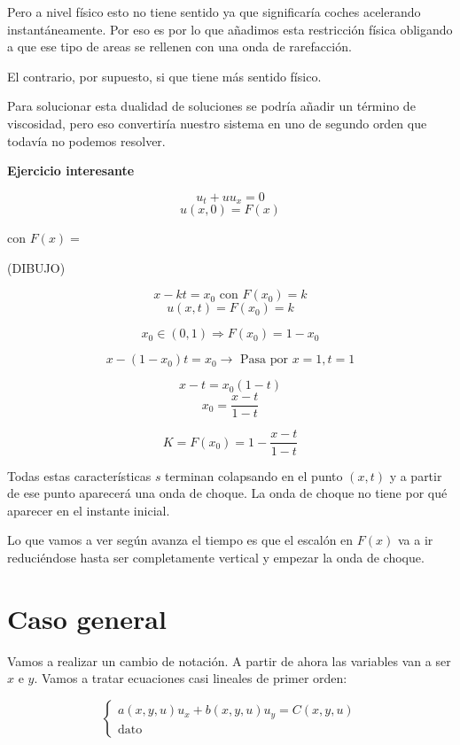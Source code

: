 		Pero a nivel físico esto no tiene sentido ya que significaría coches acelerando instantáneamente. Por eso es por lo que añadimos esta restricción física obligando a que ese tipo de areas se rellenen con una onda de rarefacción.

		El contrario, por supuesto, si que tiene más sentido físico.

		Para solucionar esta dualidad de soluciones se podría añadir un término de viscosidad, pero eso convertiría nuestro sistema en uno de segundo orden que todavía no podemos resolver.

		\textbf{Ejercicio interesante}

			$$u_t + uu_x = 0$$
			$$u(x,0) = F(x) $$

			con $F(x) = $

			(DIBUJO)

			$$x - kt = x_0 \text{ con } F(x_0) = k $$
			$$u(x,t) = F(x_0) = k$$

			$$x_0 \in (0,1) \Rightarrow F(x_0) = 1 - x_0 $$

			$$x - (1-x_0) t = x_0 \rightarrow \text{ Pasa por } x = 1, t = 1$$

			$$x-t = x_0 (1-t)$$
			$$x_0 = \frac{x-t}{1-t}$$

			$$K = F(x_0) = 1 - \frac{x-t}{1-t}$$

			Todas estas características $s$ terminan colapsando en el punto $(x,t)$ y a partir de ese punto aparecerá una onda de choque. La onda de choque no tiene por qué aparecer en el instante inicial.

			Lo que vamos a ver según avanza el tiempo es que el escalón en $F(x)$ va a ir reduciéndose hasta ser completamente vertical y empezar la onda de choque.


\section{Caso general}

	Vamos a realizar un cambio de notación. A partir de ahora las variables van a ser $x$ e $y$. Vamos a tratar ecuaciones casi lineales de primer orden:

	\begin{equation*}
		\left\{
			\begin{array}{l}
			a(x,y,u)u_x + b(x,y,u)u_y = C(x,y,u) \\
			\text{dato}
			\end{array}
		\right.
	\end{equation*}

